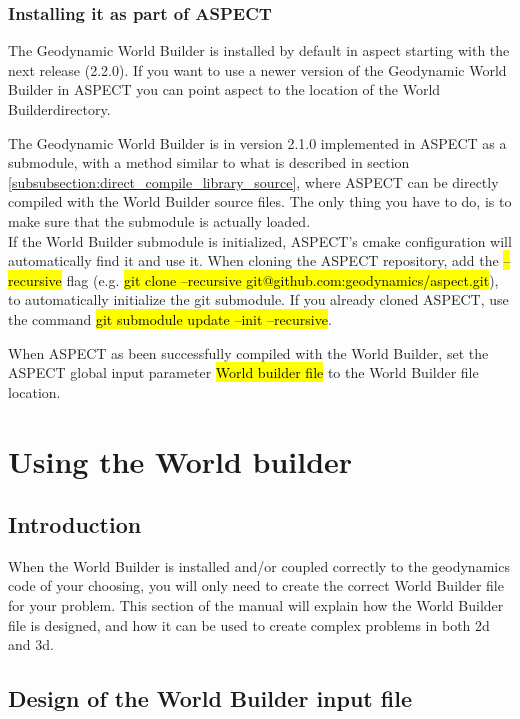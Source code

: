 \documentclass{book}
\newcommand{\GWB}{{Geodynamic World Builder}}
\newcommand{\WB}{{World Builder}}
\newcommand{\aspect}{{ASPECT}}
\newcommand{\cmake}{{cmake}}
\begin{document}
\subsection{Installing it as part of ASPECT}
The \GWB{} is installed by default in aspect starting with the next release (2.2.0). If you want to use a newer version of the \GWB{} in ASPECT you can point aspect to the location of the \WB directory.

\begin{remark}The \GWB{} is in version 2.1.0 implemented in \aspect{} as a submodule, with a method similar to what is described in section \ref{subsubsection:direct_compile_library_source}, where ASPECT can be directly compiled with the \WB{} source files. The only thing you have to do, is to make sure that the submodule is actually loaded.
\\
 If the \WB{} submodule is initialized, \aspect{}'s \cmake{} configuration will automatically find it and use it. When cloning the \aspect{} repository, add the \hl{--recursive} flag (e.g. \hl{git clone --recursive git@github.com:geodynamics/aspect.git}), to automatically initialize the git submodule. If you already cloned \aspect{}, use the command \hl{git submodule update --init --recursive}. 
\end{remark}
 
 When \aspect{} as been successfully compiled with the \WB{}, set the \aspect{} global input parameter \hl{World builder file} to the \WB{} file location. 


\chapter{Using the World builder}
\section{Introduction}
When the \WB{} is installed and/or coupled correctly to the geodynamics code of your choosing, you will only need to create the correct \WB{} file for your problem. This section of the manual will explain how the \WB{} file is designed, and how it can be used to create complex problems in both 2d and 3d. 
\section{Design of the \WB{} input file}
\end{document}
